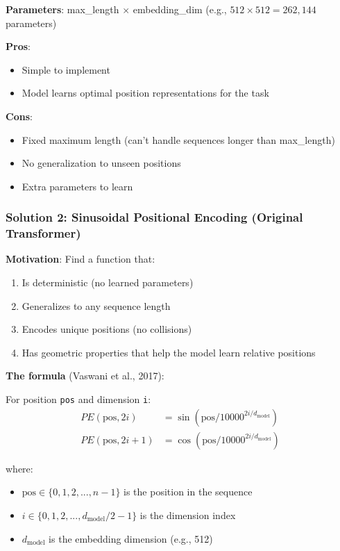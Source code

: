 \textbf{Parameters}: max\_length $\times$ embedding\_dim (e.g., $512 \times 512 = 262,144$ parameters)

\textbf{Pros}:
\begin{itemize}
\item Simple to implement
\item Model learns optimal position representations for the task
\end{itemize}

\textbf{Cons}:
\begin{itemize}
\item Fixed maximum length (can't handle sequences longer than max\_length)
\item No generalization to unseen positions
\item Extra parameters to learn
\end{itemize}

\subsubsection{Solution 2: Sinusoidal Positional Encoding (Original Transformer)}

\textbf{Motivation}: Find a function that:
\begin{enumerate}
\item Is deterministic (no learned parameters)
\item Generalizes to any sequence length
\item Encodes unique positions (no collisions)
\item Has geometric properties that help the model learn relative positions
\end{enumerate}

\textbf{The formula} (Vaswani et al., 2017):

For position \texttt{pos} and dimension \texttt{i}:
\begin{align*}
PE(\text{pos}, 2i) &= \sin(\text{pos} / 10000^{2i/d_{\text{model}}}) \\
PE(\text{pos}, 2i+1) &= \cos(\text{pos} / 10000^{2i/d_{\text{model}}})
\end{align*}

where:
\begin{itemize}
\item $\text{pos} \in \{0, 1, 2, ..., n-1\}$ is the position in the sequence
\item $i \in \{0, 1, 2, ..., d_{\text{model}}/2 - 1\}$ is the dimension index
\item $d_{\text{model}}$ is the embedding dimension (e.g., 512)
\end{itemize}


